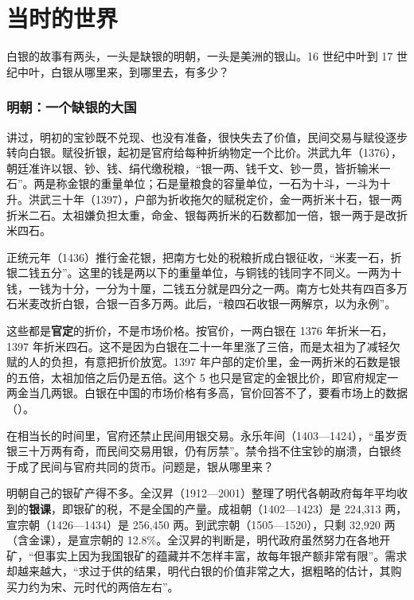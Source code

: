 \section{当时的世界}\label{sec:silver-world}

白银的故事有两头，一头是缺银的明朝，一头是美洲的银山。16 世纪中叶到 17 世纪中叶，白银从哪里来，到哪里去，有多少？

\subsubsection{明朝：一个缺银的大国}
讲过，明初的宝钞既不兑现、也没有准备，很快失去了价值，民间交易与赋役逐步转向白银。赋役折银，起初是官府给每种折纳物定一个比价。洪武九年（1376），朝廷准许以银、钞、钱、绢代缴税粮，“银一两、钱千文、钞一贯，皆折输米一石”\cite{mingshi}。两是称金银的重量单位；石是量粮食的容量单位，一石为十斗，一斗为十升。洪武三十年（1397），户部为折收拖欠的赋税定价，金一两折米十石，银一两折米二石。太祖嫌负担太重，命金、银每两折米的石数都加一倍\cite{mingshi}，银一两于是改折米四石。

正统元年（1436）推行金花银，把南方七处的税粮折成白银征收，“米麦一石，折银二钱五分”。这里的钱是两以下的重量单位，与铜钱的钱同字不同义。一两为十钱，一钱为十分，一分为十厘，二钱五分就是四分之一两。南方七处共有四百多万石米麦改折白银，合银一百多万两。此后，“粮四石收银一两解京，以为永例”\cite{mingshi}。

这些都是\textbf{官定}的折价，不是市场价格。按官价，一两白银在 1376 年折米一石，1397 年折米四石。这不是因为白银在二十一年里涨了三倍，而是太祖为了减轻欠赋的人的负担，有意把折价放宽。1397 年户部的定价里，金一两折米的石数是银的五倍，太祖加倍之后仍是五倍。这个 5 也只是官定的金银比价，即官府规定一两金当几两银。白银在中国的市场价格有多高，官价回答不了，要看市场上的数据（）。

在相当长的时间里，官府还禁止民间用银交易。永乐年间（1403—1424），“虽岁贡银三十万两有奇，而民间交易用银，仍有厉禁”\cite{mingshi}。禁令挡不住宝钞的崩溃，白银终于成了民间与官府共同的货币。问题是，银从哪里来？

明朝自己的银矿产得不多。全汉昇（1912—2001）整理了明代各朝政府每年平均收到的\textbf{银课}，即银矿的税，不是全国的产量。成祖朝（1402—1423）是 224,313 两，宣宗朝（1426—1434）是 256,450 两。到武宗朝（1505—1520），只剩 32,920 两（含金课），是宣宗朝的 12.8\%\cite{quan1968}。全汉昇的判断是，明代政府虽然努力在各地开矿，“但事实上因为我国银矿的蕴藏并不怎样丰富，故每年银产额非常有限”。需求却越来越大，“求过于供的结果，明代白银的价值非常之大，据粗略的估计，其购买力约为宋、元时代的两倍左右”\cite{quan1969}。

